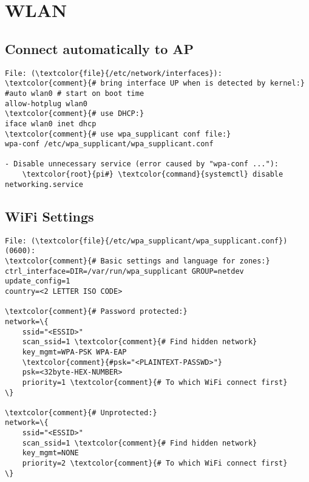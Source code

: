\documentclass[10pt, a4paper, onecolumn, openany]{book} %
\begin{document}
\section{WLAN}
\subsection{Connect automatically to AP}
\begin{Verbatim}[commandchars=\\\{\}]
File: (\textcolor{file}{/etc/network/interfaces}):
\textcolor{comment}{# bring interface UP when is detected by kernel:}
#auto wlan0 # start on boot time
allow-hotplug wlan0
\textcolor{comment}{# use DHCP:}
iface wlan0 inet dhcp
\textcolor{comment}{# use wpa_supplicant conf file:}
wpa-conf /etc/wpa_supplicant/wpa_supplicant.conf

- Disable unnecessary service (error caused by "wpa-conf ..."):
    \textcolor{root}{pi#} \textcolor{command}{systemctl} disable networking.service
\end{Verbatim}
\subsection{WiFi Settings}
\begin{Verbatim}[commandchars=\\\{\}]
File: (\textcolor{file}{/etc/wpa_supplicant/wpa_supplicant.conf}) (0600):
\textcolor{comment}{# Basic settings and language for zones:}
ctrl_interface=DIR=/var/run/wpa_supplicant GROUP=netdev
update_config=1
country=<2 LETTER ISO CODE>

\textcolor{comment}{# Password protected:}
network=\{
    ssid="<ESSID>"
    scan_ssid=1 \textcolor{comment}{# Find hidden network}
    key_mgmt=WPA-PSK WPA-EAP
    \textcolor{comment}{#psk="<PLAINTEXT-PASSWD>"}
    psk=<32byte-HEX-NUMBER>
    priority=1 \textcolor{comment}{# To which WiFi connect first}
\}

\textcolor{comment}{# Unprotected:}
network=\{
    ssid="<ESSID>"
    scan_ssid=1 \textcolor{comment}{# Find hidden network}
    key_mgmt=NONE
    priority=2 \textcolor{comment}{# To which WiFi connect first}
\}
\end{Verbatim}
\end{document}

